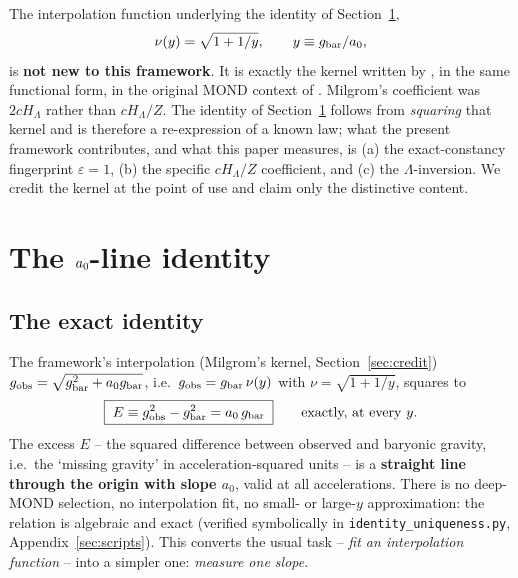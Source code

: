 \documentclass[fleqn,usenatbib]{mnras}
\newcommand{\azero}{a_0}
\begin{document}
The interpolation function underlying the identity of Section~\ref{sec:identity},
\begin{equation}
\nu(y)=\sqrt{1+1/y},\qquad y\equiv g_{\rm bar}/a_0,
\label{eq:kernel}
\end{equation}
is \textbf{not new to this framework}. It is exactly the kernel written by \citet[][Eq.~9]{Milgrom1999}, in the same functional form, in the original MOND context of \citet{Milgrom1983}. Milgrom's coefficient was $2cH_\Lambda$ rather than $cH_\Lambda/Z$. The identity of Section~\ref{sec:identity} follows from \emph{squaring} that kernel and is therefore a re-expression of a known law; what the present framework contributes, and what this paper measures, is (a) the exact-constancy fingerprint $\varepsilon=1$, (b) the specific $cH_\Lambda/Z$ coefficient, and (c) the $\Lambda$-inversion. We credit the kernel at the point of use and claim only the distinctive content.


\section{The $\protect\azero$-line identity}
\label{sec:identity}

\subsection{The exact identity}
\label{sec:exact}

The framework's interpolation (Milgrom's kernel, Section~\ref{sec:credit}) $g_{\rm obs}=\sqrt{g_{\rm bar}^2+a_0 g_{\rm bar}}$, i.e.\ $g_{\rm obs}=g_{\rm bar}\,\nu(y)$ with $\nu=\sqrt{1+1/y}$, squares to
\begin{equation}
\boxed{\;E\equiv g_{\rm obs}^2-g_{\rm bar}^2 = a_0\,g_{\rm bar}\;}\qquad\text{exactly, at every }y.
\label{eq:a0line}
\end{equation}
The excess $E$ -- the squared difference between observed and baryonic gravity, i.e.\ the `missing gravity' in acceleration-squared units -- is a \textbf{straight line through the origin with slope $a_0$}, valid at all accelerations. There is no deep-MOND selection, no interpolation fit, no small- or large-$y$ approximation: the relation is algebraic and exact (verified symbolically in \texttt{identity\_uniqueness.py}, Appendix~\ref{sec:scripts}). This converts the usual task -- \emph{fit an interpolation function} -- into a simpler one: \emph{measure one slope}.
\end{document}
